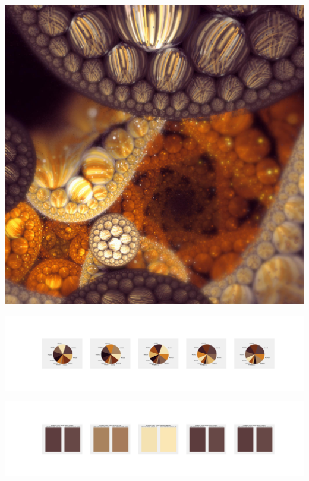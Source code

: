\documentclass[11pt]{article}
\begin{document}
\begin{landscape}
    \begin{center}
    \includegraphics[width=\textwidth]{./nbimg/file (431).jpg}
    \end{center}

    \begin{center}
    \includegraphics[width=250mm]{./nbimg/pie-369.jpg}
    \end{center}

    \begin{center}
    \includegraphics[width=250mm]{./nbimg/peak-369.jpg}
    \end{center}
    


\end{landscape}
\end{document}
